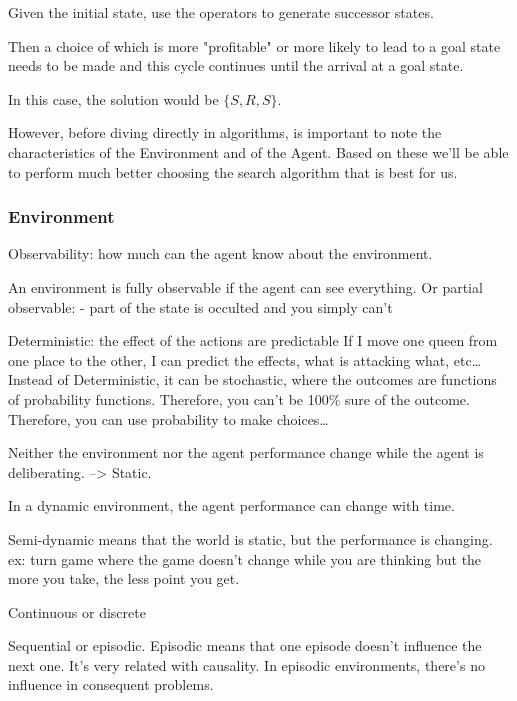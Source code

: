 Given the initial state, use the operators to generate successor states.


Then a choice of which is more "profitable" or more likely to lead to a goal state needs to be made and this cycle continues until the arrival at a goal state.


In this case, the solution would be $\{S, R, S\}$.




However, before diving directly in algorithms, is important to note the characteristics of the Environment and of the Agent. Based on these we'll be able to perform much better choosing the search algorithm that is best for us.

\subsubsection{Environment} %

Observability: how much can the agent know about the environment.

An environment is fully observable if the agent can see everything. Or partial observable:
- part of the state is occulted and you simply can't 



Deterministic: the effect of the actions are predictable
If I move one queen from one place to the other, I can predict the effects, what is attacking what, etc\dots
Instead of Deterministic, it can be stochastic, where the outcomes are functions of probability functions. Therefore, you can't be 100\% sure of the outcome. Therefore, you can use probability to make choices\dots


Neither the environment nor the agent performance change while the agent is deliberating. --> Static.

In a dynamic environment, the agent performance can change with time. 

Semi-dynamic means that the world is static, but the performance is changing. 
ex: turn game where the game doesn't change while you are thinking but the more you take, the less point you get.

Continuous or discrete


Sequential or episodic. Episodic means that one episode doesn't influence the next one. It's very related with causality. In episodic environments, there's no influence in consequent problems.

